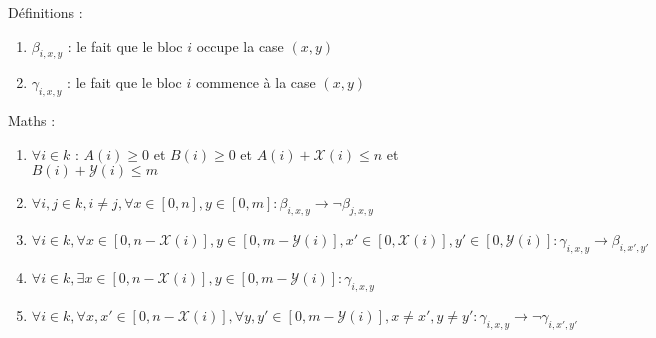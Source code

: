 \documentclass[a4paper]{article}
\begin{document}
Définitions :
\begin{enumerate}
  \item $\beta_{i, x, y}$ : le fait que le bloc $i$ occupe la case $(x,y)$
  \item $\gamma_{i, x, y}$ : le fait que le bloc $i$ commence à la case $(x,y)$
\end{enumerate}

Maths :
\begin{enumerate}
  \item $\forall i \in k$ : $A(i) \geq 0$ et $B(i) \geq 0$ et $A(i) + \mathcal{X}(i) \leq n$ et $B(i) + \mathcal{Y}(i)\leq m$

  \item $\forall i,j \in k, i \neq j, \forall x \in [0,n], y \in [0,m] : \beta_{i, x, y} \rightarrow \lnot \beta_{j, x, y}$

  \item $
  \forall i \in k,
  \forall x \in [0, n - \mathcal{X}(i)] , y \in [0, m - \mathcal{Y}(i)],
    x' \in [0, \mathcal{X}(i)], y' \in [0, \mathcal{Y}(i)] : \gamma_{i, x, y} \rightarrow \beta_{i, x', y'}
  $

  \item $\forall i \in k, \exists x \in  [0, n - \mathcal{X}(i)], y \in [0, m - \mathcal{Y}(i)] : \gamma_{i, x, y}$
  \item $
  \forall i \in k,
  \forall x,x' \in [0, n - \mathcal{X}(i)],
  \forall y,y' \in [0, m - \mathcal{Y}(i)],
  x \neq x', y \neq y' :
  \gamma_{i, x, y} \rightarrow \lnot \gamma_{i, x', y'}
  $
\end{enumerate}
\end{document}

